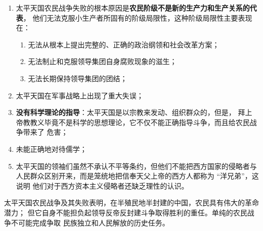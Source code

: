 \documentclass[10pt, UTF8]{book} %
\begin{document}
\begin{enumerate}[label=(\arabic*), itemsep=0pt]
    \item 太平天国农民战争失败的根本原因是\textbf{农民阶级不是新的生产力和生产关系的代表}，
    他们无法克服小生产者所固有的阶级局限性，这种阶级局限性主要表现在：
    \begin{enumerate}[label=\roman*., itemsep=0pt]
        \item 无法从根本上提出完整的、正确的政治纲领和社会改革方案；
        \item 无法制止和克服领导集团自身腐败现象的滋生；
        \item 无法长期保持领导集团的团结；
    \end{enumerate}
    \item 太平天国在军事战略上出现了重大失误；
    \item \textbf{没有科学理论的指导}：太平天国是以宗教来发动、组织群众的，但是，
    拜上帝教教义毕竟不是科学的思想理论，它不仅不能正确指导斗争，而且给农民战争带来了
    危害；
    \item 未能正确地对待儒学；
    \item 太平天国的领袖们虽然不承认不平等条约，但他们不能把西方国家的侵略者与
    人民群众区别开来，而是笼统地把信奉天父上帝的西方人都称为 “洋兄弟”，这说明
    他们对于西方资本主义侵略者还缺乏理性的认识。
\end{enumerate}


太平天国农民战争及其失败表明，在半殖民地半封建的中国，农民具有伟大的革命潜力；
但它自身不能担负起领导反帝反封建斗争取得胜利的重任。单纯的农民战争不可能完成争取
民族独立和人民解放的历史任务。
\end{document}
